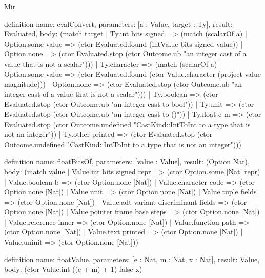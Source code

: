\begin{lexlean}{Mir}
\begin{semanticmodule}
definition{
  name: evalConvert,
  parameters: [a : Value, target : Ty],
  result: Evaluated,
  body: (match target
    | Ty.int bits signed => (match (scalarOf a)
      | Option.some value => (ctor Evaluated.found (intValue bits signed value))
      | Option.none => (ctor Evaluated.stop (ctor Outcome.ub "an integer cast of a value that is not a scalar")))
    | Ty.character => (match (scalarOf a)
      | Option.some value => (ctor Evaluated.found (ctor Value.character (project value magnitude)))
      | Option.none => (ctor Evaluated.stop (ctor Outcome.ub "an integer cast of a value that is not a scalar")))
    | Ty.boolean => (ctor Evaluated.stop (ctor Outcome.ub "an integer cast to bool"))
    | Ty.unit => (ctor Evaluated.stop (ctor Outcome.ub "an integer cast to ()"))
    | Ty.float e m => (ctor Evaluated.stop (ctor Outcome.undefined "CastKind::IntToInt to a type that is not an integer"))
    | Ty.other printed => (ctor Evaluated.stop (ctor Outcome.undefined "CastKind::IntToInt to a type that is not an integer")))
}

definition{
  name: floatBitsOf,
  parameters: [value : Value],
  result: (Option Nat),
  body: (match value
    | Value.int bits signed repr => (ctor Option.some [Nat] repr)
    | Value.boolean b => (ctor Option.none [Nat])
    | Value.character code => (ctor Option.none [Nat])
    | Value.unit => (ctor Option.none [Nat])
    | Value.tuple fields => (ctor Option.none [Nat])
    | Value.adt variant discriminant fields => (ctor Option.none [Nat])
    | Value.pointer frame base steps => (ctor Option.none [Nat])
    | Value.reference inner => (ctor Option.none [Nat])
    | Value.function path => (ctor Option.none [Nat])
    | Value.text printed => (ctor Option.none [Nat])
    | Value.uninit => (ctor Option.none [Nat]))
}

definition{
  name: floatValue,
  parameters: [e : Nat, m : Nat, x : Nat],
  result: Value,
  body: (ctor Value.int ((e + m) + 1) false x)
}


\end{semanticmodule}
\end{lexlean}
